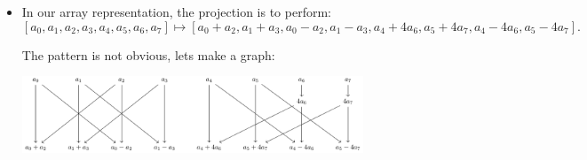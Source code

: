 \begin{frame}
    \begin{itemize}
        \item In our array representation, the projection is to perform:
        \[ 
            [a_{0}, a_{1}, a_{2}, a_{3}, a_{4}, a_{5}, a_{6}, a_{7}] \mapsto [a_{0} + a_{2}, a_{1} + a_{3}, a_{0} - a_{2}, a_{1} - a_{3}, a_{4} + 4a_{6}, a_{5} + 4a_{7}, a_{4} - 4a_{6}, a_{5} - 4a_{7}].
        \]
    
        The pattern is not obvious, lets make a graph: 
        \begin{center}
            \includegraphics[width=0.8\textwidth]{tikzcd3.pdf}
        \end{center}

    \end{itemize}
\end{frame}

